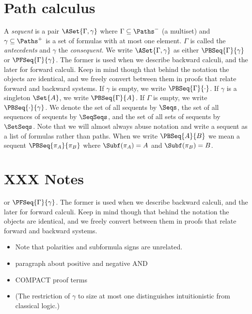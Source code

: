 \section{Path calculus}

\begin{definition}[Sequents]
  A \emph{sequent} is a pair $\ASet{\Gamma,\gamma}$
  where $\Gamma\subseteq\Paths^-$ (a multiset) and $\gamma\subseteq \Paths^+$
  is a set of formulas with at most one element.
  $\Gamma$ is called the \emph{antecedents}
  and $\gamma$ the \emph{consequent}.
  We write $\ASet{\Gamma,\gamma}$ as either $\PBSeq{\Gamma}{\gamma}$
  or $\PFSeq{\Gamma}{\gamma}$.  The former is used when we describe
  backward calculi, and the later for forward calculi.  Keep in mind
  though that behind the notation the objects are identical, and we freely
  convert between them in proofs that relate forward and backward systems.
  If $\gamma$ is empty, we write $\PBSeq{\Gamma}{\cdot}$.
  If $\gamma$ is a singleton $\Set{A}$, we write $\PBSeq{\Gamma}{A}$.
  If $\Gamma$ is empty, we write $\PBSeq{\cdot}{\gamma}$.
  We denote the set of all sequents by $\Seqs$,
  the set of all sequences of sequents by $\SeqSeqs$, and
  the set of all sets of sequents by $\SetSeqs$.
  Note that we will almost always abuse notation and write a sequent
  as a list of formulas rather than paths.  When we write
  $\PBSeq{A}{B}$ we mean a sequent $\PBSeq{\pi_A}{\pi_B}$ where
  $\Subf(\pi_A) = A$ and $\Subf(\pi_B) = B$.
\end{definition}

\section{XXX Notes}
or $\PFSeq{\Gamma}{\gamma}$.  The former is used when we describe
  backward calculi, and the later for forward calculi.  Keep in mind
  though that behind the notation the objects are identical, and we freely
  convert between them in proofs that relate forward and backward systems.

\begin{itemize}
\item Note that polarities and subformula signs are unrelated.
\item paragraph about positive and negative AND
\item COMPACT proof terms
\item (The restriction of $\gamma$ to size at most one distinguishes
    intuitionistic from classical logic.)
\end{itemize}

